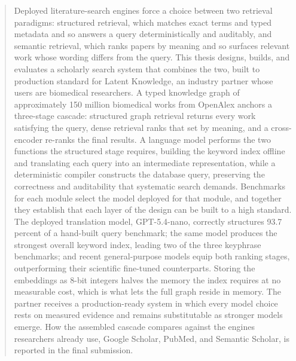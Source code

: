 \begin{abstract}
Deployed literature-search engines force a choice between two retrieval paradigms: structured retrieval, which matches exact terms and typed metadata and so answers a query deterministically and auditably, and semantic retrieval, which ranks papers by meaning and so surfaces relevant work whose wording differs from the query. This thesis designs, builds, and evaluates a scholarly search system that combines the two, built to production standard for Latent Knowledge, an industry partner whose users are biomedical researchers. A typed knowledge graph of approximately 150 million biomedical works from OpenAlex anchors a three-stage cascade: structured graph retrieval returns every work satisfying the query, dense retrieval ranks that set by meaning, and a cross-encoder re-ranks the final results. A language model performs the two functions the structured stage requires, building the keyword index offline and translating each query into an intermediate representation, while a deterministic compiler constructs the database query, preserving the correctness and auditability that systematic search demands.
Benchmarks for each module select the model deployed for that module, and together they establish that each layer of the design can be built to a high standard. The deployed translation model, GPT-5.4-nano, correctly structures 93.7 percent of a hand-built query benchmark; the same model produces the strongest overall keyword index, leading two of the three keyphrase benchmarks; and recent general-purpose models equip both ranking stages, outperforming their scientific fine-tuned counterparts. Storing the embeddings as 8-bit integers halves the memory the index requires at no measurable cost, which is what lets the full graph reside in memory. The partner receives a production-ready system in which every model choice rests on measured evidence and remains substitutable as stronger models emerge. How the assembled cascade compares against the engines researchers already use, Google Scholar, PubMed, and Semantic Scholar, is reported in the final submission.
\end{abstract}